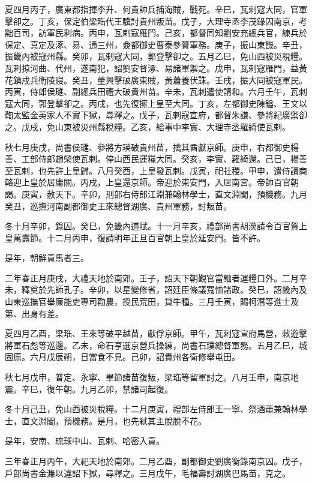 \begin{pinyinscope}
夏四月丙子，廣東都指揮李升、何貴帥兵捕海賊，戰死。辛巳，瓦剌寇大同，官軍擊卻之。丁亥，保定伯梁珤代王驥討貴州叛苗。戊子，大理寺丞李茂錄囚南京，考黜百司，訪軍民利病。丙申，瓦剌寇雁門。己亥，都督同知劉安充總兵官，練兵於保定、真定及涿、易、通三州，僉都御史曹泰參贊軍務。庚子，振山東饑。辛丑，振畿內被寇州縣。癸卯，瓦剌寇大同，郭登擊卻之。五月乙巳，免山西被災稅糧。瓦剌掠河曲、代州，遂南犯，詔劉安督涿、易諸軍禦之。戊申，瓦剌寇雁門，益黃花鎮戍兵衛陵寢。癸丑，董興擊破廣東賊，黃蕭養伏誅。壬戌，振大同被寇軍民。丙寅，侍郎侯璡、副總兵田禮大破貴州苗。辛未，瓦剌遣使請和。六月壬午，瓦剌寇大同，郭登擊卻之。丙戌，也先復擁上皇至大同。丁亥，左都御史陳鎰、王文以鞫太監金英家人不實下獄，尋釋之。戊子，瓦剌寇宣府，都督朱謙、參將紀廣禦卻之。戊戌，免山東被災州縣稅糧。乙亥，給事中李實、大理寺丞羅綺使瓦剌。

秋七月庚戌，尚書侯璡、參將方瑛破貴州苗，擒其酋獻京師。庚申，右都御史楊善、工部侍郎趙榮使瓦剌。停山西民運糧大同。癸亥，李實、羅綺還。己巳，楊善至瓦剌，也先許上皇歸。八月癸酉，上皇發瓦剌。戊寅，祀社稷。甲申，遣侍讀商輅迎上皇於居庸關。丙戌，上皇還京師。帝迎於東安門，入居南宮。帝帥百官朝謁。庚寅，赦天下。辛卯，刑部右侍郎江淵兼翰林學士，直文淵閣，預機務。九月癸丑，巡撫河南副都御史王來總督湖廣、貴州軍務，討叛苗。

冬十月辛卯，錄囚。癸巳，免畿內逋賦。十一月辛亥，禮部尚書胡濙請令百官賀上皇萬壽節。十二月丙申，復請明年正旦百官朝上皇於延安門。皆不許。

是年，朝鮮貢馬者三。

二年春正月庚戌，大禮天地於南郊。壬子，詔天下朝覲官當黜者運糧口外。二月辛未，釋奠於先師孔子。辛卯，以星變修省，詔廷臣條議寬恤諸政。癸巳，詔畿內及山東巡撫官舉廉能吏專司勸農，授民荒田，貸牛種。三月壬寅，賜柯潛等進士及第、出身有差。

夏四月乙酉，梁珤、王來等破平越苗，獻俘京師。甲午，瓦剌寇宣府馬營，敕遊擊將軍石彪等巡邊。乙未，命石亨選京營兵操練，尚書石璞總督軍務。五月乙巳，城固原。六月戊辰朔，日當食不見。己卯，詔貴州各衛修舉屯田。

秋七月戊申，普定、永寧、畢節諸苗復叛，梁珤等留軍討之。八月壬申，南京地震。辛巳，復午朝。九月乙卯，禁諸司起復。

冬十月己丑，免山西被災稅糧。十二月庚寅，禮部左侍郎王一寧、祭酒蕭兼翰林學士，直文淵閣，預機務。是月，也先弒其主脫脫不花。

是年，安南、琉球中山、瓦剌、哈密入貢。

三年春正月丙午，大祀天地於南郊。二月乙酉，副都御史劉廣衡錄南京囚。戊子，戶部尚書金濂以違詔下獄，尋釋之。三月戊午，毛福壽討湖廣巴馬苗，克之。


\end{pinyinscope}
